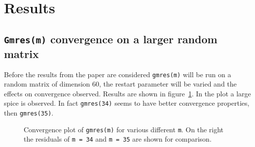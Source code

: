 \section{Results}
\subsection{\texttt{Gmres(m)} convergence on a larger random matrix}
Before the results from the paper are considered \texttt{gmres(m)} will be run on a random matrix of dimension $60$, the restart parameter will be varied and the effects on convergence observed. Results are shown in figure~\ref{fig:randCompM}.
In the plot a large spice is observed. In fact \texttt{gmres(34)} seems to have better convergence properties, then \texttt{gmres(35)}. 
\begin{figure}


\caption{Convergence plot of \texttt{gmres(m)} for various different \texttt{m}. On the right the residuals of \texttt{m = 34} and \texttt{m = 35} are shown for comparison.}
\label{fig:randCompM}
\end{figure}

